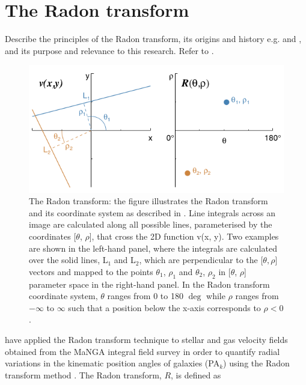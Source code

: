 \section{The Radon transform}
Describe the principles of the Radon transform, its origins and history e.g. \citet{radon1917determination} and  \citet{7910dc8d5b654c90ac4bc94c67d06f01}, and its purpose and relevance to this research. Refer to \cite{2018MNRAS.480.2217S}.

\begin{figure}
    \centering
    \includegraphics[width=\columnwidth]{images/RadonPlots/Radon-transform-Stark.png}
    \caption{The Radon transform: the figure illustrates the Radon transform and its coordinate system as described in \citet{2018MNRAS.480.2217S}. Line integrals across an image are calculated along all possible lines, parameterised by the coordinates [$\theta$, $\rho$], that cross the 2D function v(x, y). Two examples are shown in the left-hand panel, where the integrals are calculated over the solid lines, L$_1$ and L$_2$, which are perpendicular to the [$\theta, \rho$] vectors and mapped to the points $\theta_1$, $\rho_1$ and $\theta_2$, $\rho_2$ in [$\theta$, $\rho$] parameter space in the right-hand panel. In the Radon transform coordinate system, $\theta$ ranges from 0 to 180 $\deg$ while $\rho$ ranges from $-\infty$ to $\infty$  such that a position below the x-axis corresponds to $\rho < 0$.}
    \label{fig:RadonTransform}
\end{figure}

\citet{2018MNRAS.480.2217S} have applied the Radon transform technique to stellar and gas velocity fields obtained from the MaNGA integral field survey in order to quantify radial variations in the kinematic position angles of galaxies (PA$_k$) using the Radon transform method \citep[see e.g.][]{radon1917determination, 7910dc8d5b654c90ac4bc94c67d06f01}. 
The Radon transform, $R$, is defined as

